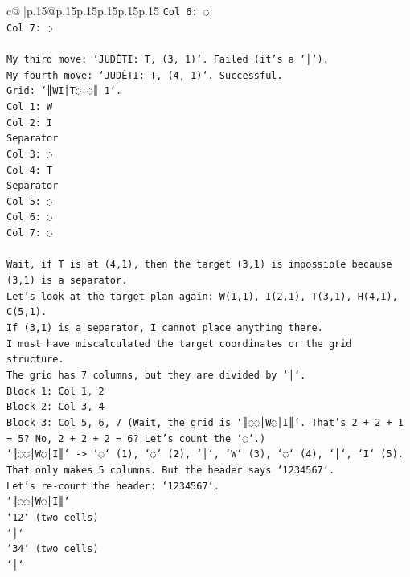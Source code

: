 \documentclass{article}
\begin{document}
{\begin{supertabular}{c@{$\;$}|p{.15\linewidth}@{}p{.15\linewidth}p{.15\linewidth}p{.15\linewidth}p{.15\linewidth}p{.15\linewidth}}
{{{\texttt{Col 6: ◌} \\
\texttt{Col 7: ◌} \\
\\ 
\texttt{My third move: `JUDĖTI: T, (3, 1)`. Failed (it's a `│`).} \\
\texttt{My fourth move: `JUDĖTI: T, (4, 1)`. Successful.} \\
\texttt{Grid: `║WI│T◌│◌║ 1`.} \\
\texttt{Col 1: W} \\
\texttt{Col 2: I} \\
\texttt{Separator} \\
\texttt{Col 3: ◌} \\
\texttt{Col 4: T} \\
\texttt{Separator} \\
\texttt{Col 5: ◌} \\
\texttt{Col 6: ◌} \\
\texttt{Col 7: ◌} \\
\\ 
\texttt{Wait, if T is at (4,1), then the target (3,1) is impossible because (3,1) is a separator.} \\
\texttt{Let's look at the target plan again: W(1,1), I(2,1), T(3,1), H(4,1), C(5,1).} \\
\texttt{If (3,1) is a separator, I cannot place anything there.} \\
\texttt{I must have miscalculated the target coordinates or the grid structure.} \\
\texttt{The grid has 7 columns, but they are divided by `│`.} \\
\texttt{Block 1: Col 1, 2} \\
\texttt{Block 2: Col 3, 4} \\
\texttt{Block 3: Col 5, 6, 7 (Wait, the grid is `║◌◌│W◌│I║`. That's 2 + 2 + 1 = 5? No, 2 + 2 + 2 = 6? Let's count the `◌`.)} \\
\texttt{`║◌◌│W◌│I║` {-}> `◌` (1), `◌` (2), `│`, `W` (3), `◌` (4), `│`, `I` (5).} \\
\texttt{That only makes 5 columns. But the header says `1234567`.} \\
\texttt{Let's re{-}count the header: `1234567`.} \\
\texttt{`║◌◌│W◌│I║`} \\
\texttt{`12` (two cells)} \\
\texttt{`│`} \\
\texttt{`34` (two cells)} \\
\texttt{`│`} \\
}}}
\end{supertabular}}
\end{document}

